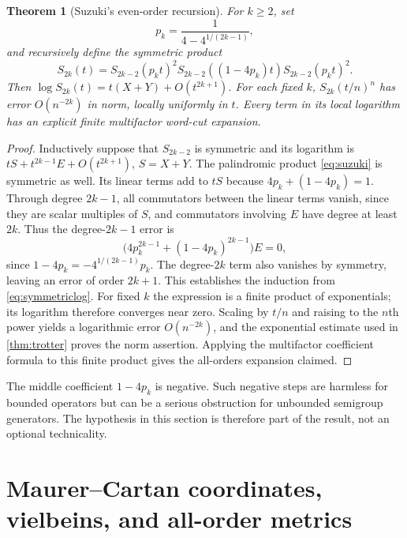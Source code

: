 \documentclass[11pt]{article}
\numberwithin{equation}{section}
\newtheorem{theorem}{Theorem}[section]
\theoremstyle{definition}
\theoremstyle{remark}
\begin{document}
\begin{theorem}[Suzuki's even-order recursion]\label{thm:suzuki}
For $k\geq2$, set
\begin{equation}\label{eq:suzukip}
 p_k=\frac1{4-4^{1/(2k-1)}},
\end{equation}
and recursively define the symmetric product
\begin{equation}\label{eq:suzuki}
 S_{2k}(t)=S_{2k-2}(p_kt)^2
          S_{2k-2}((1-4p_k)t)
          S_{2k-2}(p_kt)^2.
\end{equation}
Then $\log S_{2k}(t)=t(X+Y)+O(t^{2k+1})$. For each fixed $k$,
$S_{2k}(t/n)^n$ has error $O(n^{-2k})$ in norm, locally uniformly
in $t$. Every term in its local logarithm has an explicit finite
multifactor word-cut expansion.
\end{theorem}
\begin{proof}
Inductively suppose that $S_{2k-2}$ is symmetric and its logarithm
is $tS+t^{2k-1}E+O(t^{2k+1})$, $S=X+Y$. The palindromic product
\eqref{eq:suzuki} is symmetric as well. Its linear terms add to
$tS$ because $4p_k+(1-4p_k)=1$. Through degree $2k-1$, all
commutators between the linear terms vanish, since they are scalar
multiples of $S$, and commutators involving $E$ have degree at
least $2k$. Thus the degree-$2k-1$ error is
\[
 \bigl(4p_k^{2k-1}+(1-4p_k)^{2k-1}\bigr)E=0,
\]
since $1-4p_k=-4^{1/(2k-1)}p_k$. The degree-$2k$ term also
vanishes by symmetry, leaving an error of order $2k+1$.
This establishes the induction from \eqref{eq:symmetriclog}.
For fixed $k$ the expression is a finite product of exponentials;
its logarithm therefore converges near zero. Scaling by $t/n$ and
raising to the $n$th power yields a logarithmic error
$O(n^{-2k})$, and the exponential estimate used in
\cref{thm:trotter} proves the norm assertion. Applying the
multifactor coefficient formula to this finite product gives the
all-orders expansion claimed.
\end{proof}
The middle coefficient $1-4p_k$ is negative. Such negative steps
are harmless for bounded operators but can be a serious obstruction
for unbounded semigroup generators. The hypothesis in this section
is therefore part of the result, not an optional technicality.

\section{Maurer--Cartan coordinates, vielbeins, and all-order metrics}
\label{sec:geometry}
\end{document}
